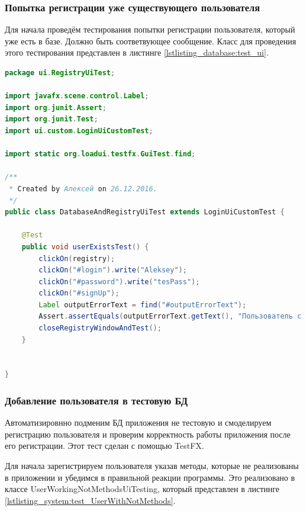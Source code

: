 \documentclass[a4paper,12pt]{article}
\begin{document}
\subsubsection{Попытка регистрации уже существующего пользователя}
Для начала проведём тестирования попытки регистрации пользователя, который уже есть в базе. Должно быть соответвующее сообщение. Класс для проведения этого тестирования представлен в листинге \ref{lstlisting_database:test_ui}.

\begin{lstlisting}[language=java, caption=код модуля DatabaseAndRegistryUiTest.java, label=lstlisting_database:test_ui]
package ui.RegistryUiTest;

import javafx.scene.control.Label;
import org.junit.Assert;
import org.junit.Test;
import ui.custom.LoginUiCustomTest;

import static org.loadui.testfx.GuiTest.find;

/**
 * Created by Алексей on 26.12.2016.
 */
public class DatabaseAndRegistryUiTest extends LoginUiCustomTest {

    @Test
    public void userExistsTest() {
        clickOn(registry);
        clickOn("#login").write("Aleksey");
        clickOn("#password").write("tesPass");
        clickOn("#signUp");
        Label outputErrorText = find("#outputErrorText");
        Assert.assertEquals(outputErrorText.getText(), "Пользователь с логином: Aleksey существует!");
        closeRegistryWindowAndTest();
    }


}
\end{lstlisting}

\subsubsection{Добавление пользователя в тестовую БД}
Автоматизировнно подменим БД приложения не тестовую и смоделируем регистрацию пользователя и проверим корректность работы приложения после его регистрации. Этот тест сделан с помощью TestFX. 
\par Для начала зарегистрируем пользователя указав методы, которые не реализованы в приложении и убедимся в правильной реакции программы. Это реализовано в классе UserWorkingNotMethodsUiTesting, который представлен в листинге \ref{lstlisting_system:test_UserWithNotMethods}.
\end{document}
